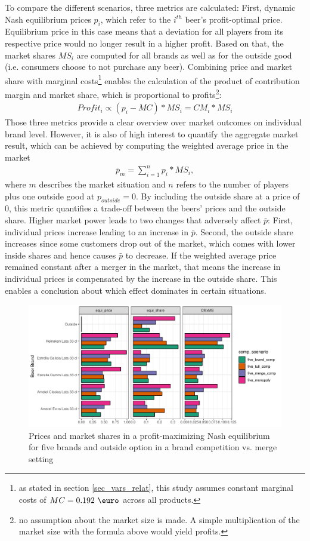 \documentclass[12pt,a4paper]{article}
\begin{document}
To compare the different scenarios, three metrics are calculated: First, dynamic Nash equilibrium prices $p_i$, which refer to the $i^{th}$ beer's profit-optimal price.
Equilibrium price in this case means that a deviation for all players from its respective price would no longer result in a higher profit.
Based on that, the market shares $MS_i$ are computed for all brands as well as for the outside good (i.e. consumers choose to not purchase any beer).
Combining price and market share with marginal costs\footnote{as stated in section \ref{sec_vars_relat}, this study assumes constant marginal costs of $MC = 0.192 \text{ \euro}$ across all products.} enables the calculation of the product of contribution margin and market share, which is proportional to profits\footnote{no assumption about the market size is made. A simple multiplication of the market size with the formula above would yield profits.}:
\begin{align*}
Profit_i \propto (p_i - MC) * MS_i = CM_i * MS_i
\end{align*}
Those three metrics provide a clear overview over market outcomes on individual brand level.
However, it is also of high interest to quantify the aggregate market result, which can be achieved by computing the weighted average price in the market 
\begin{align*}
\bar{p}_m = \sum_{i=1}^n{p_i * MS_i},
\end{align*}
where $m$ describes the market situation and $n$ refers to the number of players plus one outside good at $p_{outside} = 0$.
By including the outside share at a price of 0, this metric quantifies a trade-off between the beers' prices and the outside share.
Higher market power leads to two changes that adversely affect $\bar{p}$: First, individual prices increase leading to an increase in $\bar{p}$.
Second, the outside share increases since some customers drop out of the market, which comes with lower inside shares and hence causes $\bar{p}$ to decrease.
If the weighted average price remained constant after a merger in the market, that means the increase in individual prices is compensated by the increase in the outside share.
This enables a conclusion about which effect dominates in certain situations.

\begin{figure}[ht]
	\centering
  \includegraphics[scale = 0.7]{figures/bar_price_share_brand_merge_5.pdf}
	\caption{Prices and market shares in a profit-maximizing Nash equilibrium for five brands and outside option in a brand competition vs. merge setting}
	\label{fig_bar_five}
\end{figure}
\end{document}
